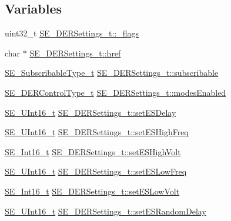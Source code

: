 \subsection*{Variables}
\begin{DoxyCompactItemize}
\item 
uint32\+\_\+t \hyperlink{group__DERSettings_ga2c1242ff7f135c60430a5604d2f1a83a}{S\+E\+\_\+\+D\+E\+R\+Settings\+\_\+t\+::\+\_\+flags}
\item 
char $\ast$ \hyperlink{group__DERSettings_gad6e6e2ae01c694650bbc075b9b188b83}{S\+E\+\_\+\+D\+E\+R\+Settings\+\_\+t\+::href}
\item 
\hyperlink{group__SubscribableType_ga5c41f553d369710ed34619266bf2551e}{S\+E\+\_\+\+Subscribable\+Type\+\_\+t} \hyperlink{group__DERSettings_gab98f5df1cc2b74bce92993f9b25a0331}{S\+E\+\_\+\+D\+E\+R\+Settings\+\_\+t\+::subscribable}
\item 
\hyperlink{group__DERControlType_gae0eefcd49e1cd98d709327c88f20a76b}{S\+E\+\_\+\+D\+E\+R\+Control\+Type\+\_\+t} \hyperlink{group__DERSettings_gaecab29deffa8f7119731d05b84fcc071}{S\+E\+\_\+\+D\+E\+R\+Settings\+\_\+t\+::modes\+Enabled}
\item 
\hyperlink{group__UInt16_gac68d541f189538bfd30cfaa712d20d29}{S\+E\+\_\+\+U\+Int16\+\_\+t} \hyperlink{group__DERSettings_gad664e0997c68f283b185484d139e6ad6}{S\+E\+\_\+\+D\+E\+R\+Settings\+\_\+t\+::set\+E\+S\+Delay}
\item 
\hyperlink{group__UInt16_gac68d541f189538bfd30cfaa712d20d29}{S\+E\+\_\+\+U\+Int16\+\_\+t} \hyperlink{group__DERSettings_ga7a857f8a4b6489b0d8ae60455b57e5ae}{S\+E\+\_\+\+D\+E\+R\+Settings\+\_\+t\+::set\+E\+S\+High\+Freq}
\item 
\hyperlink{group__Int16_ga0d600c7df811a7d4b4816e8965877690}{S\+E\+\_\+\+Int16\+\_\+t} \hyperlink{group__DERSettings_ga9e1a2f2b9469c0ee78fa18ecd81896ae}{S\+E\+\_\+\+D\+E\+R\+Settings\+\_\+t\+::set\+E\+S\+High\+Volt}
\item 
\hyperlink{group__UInt16_gac68d541f189538bfd30cfaa712d20d29}{S\+E\+\_\+\+U\+Int16\+\_\+t} \hyperlink{group__DERSettings_ga2fbc27ba03bb7454ea4f831a454b1687}{S\+E\+\_\+\+D\+E\+R\+Settings\+\_\+t\+::set\+E\+S\+Low\+Freq}
\item 
\hyperlink{group__Int16_ga0d600c7df811a7d4b4816e8965877690}{S\+E\+\_\+\+Int16\+\_\+t} \hyperlink{group__DERSettings_ga853797a5f4bfd6f027af1c57739b5574}{S\+E\+\_\+\+D\+E\+R\+Settings\+\_\+t\+::set\+E\+S\+Low\+Volt}
\item 
\hyperlink{group__UInt16_gac68d541f189538bfd30cfaa712d20d29}{S\+E\+\_\+\+U\+Int16\+\_\+t} \hyperlink{group__DERSettings_gabc0d530d1a2b90d4e8c32bed0b98a43d}{S\+E\+\_\+\+D\+E\+R\+Settings\+\_\+t\+::set\+E\+S\+Random\+Delay}

\end{DoxyCompactItemize}
